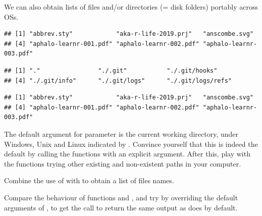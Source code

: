\documentclass[krantz2]{krantz}\usepackage{knitr}%
\begin{document}
We can also obtain lists of files and/or directories (= disk folders) portably across OSs.
\begin{knitrout}\footnotesize
{}\color{fgcolor}\begin{kframe}
\begin{alltt}
\hlstd{(}\hlstd{())}
\end{alltt}
\begin{verbatim}
## [1] "abbrev.sty"            "aka-r-life-2019.prj"   "anscombe.svg"         
## [4] "aphalo-learnr-001.pdf" "aphalo-learnr-002.pdf" "aphalo-learnr-003.pdf"
\end{verbatim}
\begin{alltt}
\hlstd{(}\hlstd{())}
\end{alltt}
\begin{verbatim}
## [1] "."                "./.git"           "./.git/hooks"    
## [4] "./.git/info"      "./.git/logs"      "./.git/logs/refs"
\end{verbatim}
\begin{alltt}
\hlstd{(}\hlstd{())}
\end{alltt}
\begin{verbatim}
## [1] "abbrev.sty"            "aka-r-life-2019.prj"   "anscombe.svg"         
## [4] "aphalo-learnr-001.pdf" "aphalo-learnr-002.pdf" "aphalo-learnr-003.pdf"
\end{verbatim}
\end{kframe}
\end{knitrout}

\begin{playground}
The default argument for parameter  is the current working directory, under Windows, Unix and Linux indicated by  . Convince yourself that this is indeed the default by calling the functions with an explicit argument. After this, play with the functions trying other existing and non-existent paths in your computer.
\end{playground}

\begin{playground}
Combine the use of  with  to obtain a list of files names.
\end{playground}

\begin{playground}
Compare the behaviour of functions  and , and try by overriding the default arguments of , to get the call to return the same output as  does by default.
\end{playground}
\end{document}
